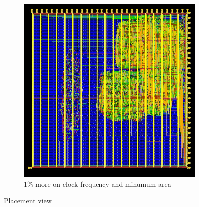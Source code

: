 \begin{figure}[!htbp]
    \begin{subfigure}[b]{0.4\linewidth}
\includegraphics[width=1\linewidth,scale=0.6,angle=0]{../project/physical_design/images_1_minarea/DLX_IR_SIZE32_PC_SIZE32_1_minarea_place_prerouting.jpg}
\caption{1\% more on clock frequency and minumum area}
\label{fig:plac1minarea}
  \end{subfigure}
\caption{Placement view}
  \label{fig:place}
\end{figure}
